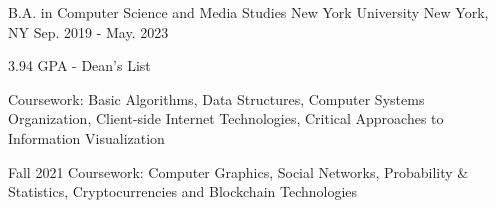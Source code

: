 

\begin{cventries}

  \cventry
    {B.A. in Computer Science and Media Studies} %
    {New York University} %
    {New York, NY} %
    {Sep. 2019 - May. 2023} %
    {
      \begin{cvitems} %
        \item {3.94 GPA - Dean's List}
        \item {Coursework: Basic Algorithms, Data Structures, Computer Systems Organization, Client-side Internet Technologies, Critical Approaches to Information Visualization}
        \item {Fall 2021 Coursework: Computer Graphics, Social Networks, Probability \& Statistics, Cryptocurrencies and Blockchain Technologies}
      \end{cvitems}
    }

\end{cventries}
